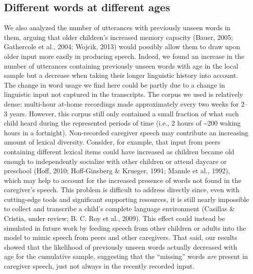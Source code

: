 \documentclass[man,mask,floatsintext]{apa6}
\begin{document}
\subsection{Different words at different
ages}\label{different-words-at-different-ages}

We also analyzed the number of utterances with previously unseen words
in them, arguing that older children's increased memory capacity (Bauer,
2005; Gathercole et al., 2004; Wojcik, 2013) would possibly allow them
to draw upon older input more easily in producing speech. Indeed, we
found an increase in the number of utterances containing previously
unseen words with age in the local sample but a decrease when taking
their longer linguistic history into account. The change in word usage
we find here could be partly due to a change in linguistic input not
captured in the transcripts. The corpus we used is relatively dense:
multi-hour at-home recordings made approximately every two weeks for
2--3 years. However, this corpus still only contained a small fraction
of what each child heard during the represented periods of time (i.e., 2
hours of \textasciitilde{}200 waking hours in a fortnight). Non-recorded
caregiver speech may contribute an increasing amount of lexical
diversity. Consider, for example, that input from peers containing
different lexical items could have increased as children became old
enough to independently socialize with other children or attend daycare
or preschool (Hoff, 2010; Hoff-Ginsberg \& Krueger, 1991; Mannle et al.,
1992), which may help to account for the increased presence of words not
found in the caregiver's speech. This problem is difficult to address
directly since, even with cutting-edge tools and significant supporting
resources, it is still nearly impossible to collect and transcribe a
child's complete language environment (Casillas \& Cristia, under
review; B. C. Roy et al., 2009). This effect could instead be simulated
in future work by feeding speech from other children or adults into the
model to mimic speech from peers and other caregivers. That said, our
results showed that the likelihood of previously unseen words actually
decreased with age for the cumulative sample, suggesting that the
\enquote{missing} words \emph{are} present in caregiver speech, just not
always in the recently recorded input.
\end{document}
